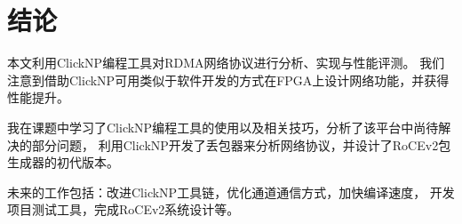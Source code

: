 \chapter{结论}
本文利用ClickNP编程工具对RDMA网络协议进行分析、实现与性能评测。
我们注意到借助ClickNP可用类似于软件开发的方式在FPGA上设计网络功能，并获得性能提升。

我在课题中学习了ClickNP编程工具的使用以及相关技巧，分析了该平台中尚待解决的部分问题，
利用ClickNP开发了丢包器来分析网络协议，并设计了RoCEv2包生成器的初代版本。

未来的工作包括：改进ClickNP工具链，优化通道通信方式，加快编译速度，
开发项目测试工具，完成RoCEv2系统设计等。
